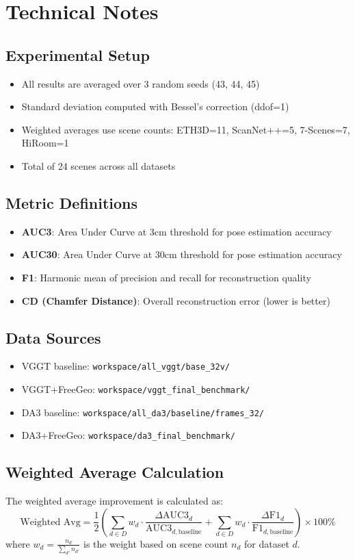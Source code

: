 \documentclass{article}
\begin{document}
\section{Technical Notes}

\subsection{Experimental Setup}
\begin{itemize}
    \item All results are averaged over 3 random seeds (43, 44, 45)
    \item Standard deviation computed with Bessel's correction (ddof=1)
    \item Weighted averages use scene counts: ETH3D=11, ScanNet++=5, 7-Scenes=7, HiRoom=1
    \item Total of 24 scenes across all datasets
\end{itemize}

\subsection{Metric Definitions}
\begin{itemize}
    \item \textbf{AUC3}: Area Under Curve at 3cm threshold for pose estimation accuracy
    \item \textbf{AUC30}: Area Under Curve at 30cm threshold for pose estimation accuracy
    \item \textbf{F1}: Harmonic mean of precision and recall for reconstruction quality
    \item \textbf{CD (Chamfer Distance)}: Overall reconstruction error (lower is better)
\end{itemize}

\subsection{Data Sources}
\begin{itemize}
    \item VGGT baseline: \texttt{workspace/all\_vggt/base\_32v/}
    \item VGGT+FreeGeo: \texttt{workspace/vggt\_final\_benchmark/}
    \item DA3 baseline: \texttt{workspace/all\_da3/baseline/frames\_32/}
    \item DA3+FreeGeo: \texttt{workspace/da3\_final\_benchmark/}
\end{itemize}

\subsection{Weighted Average Calculation}
The weighted average improvement is calculated as:
\begin{equation}
\text{Weighted Avg} = \frac{1}{2}\left(\sum_{d \in D} w_d \cdot \frac{\Delta \text{AUC3}_d}{\text{AUC3}_{d,\text{baseline}}} + \sum_{d \in D} w_d \cdot \frac{\Delta \text{F1}_d}{\text{F1}_{d,\text{baseline}}}\right) \times 100\%
\end{equation}
where $w_d = \frac{n_d}{\sum_{d'} n_{d'}}$ is the weight based on scene count $n_d$ for dataset $d$.
\end{document}
